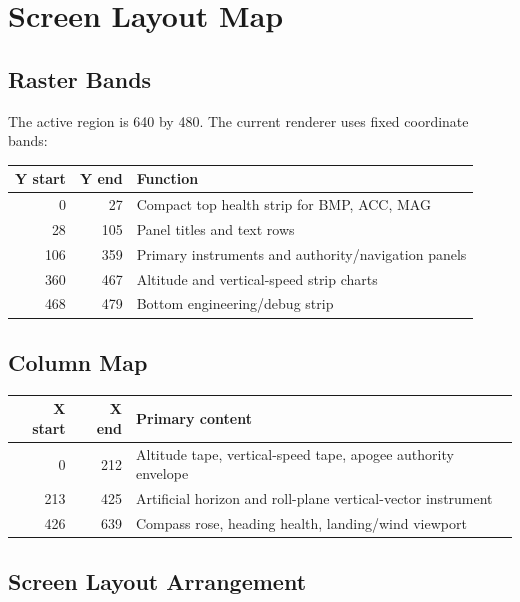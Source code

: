 \documentclass{article}
\begin{document}
\section{Screen Layout Map}

\subsection{Raster Bands}

The active region is 640 by 480.  The current renderer uses fixed coordinate
bands:

\begin{center}
\begin{tabular}{r r l}
\toprule
\textbf{Y start} & \textbf{Y end} & \textbf{Function} \\
\midrule
0   & 27  & Compact top health strip for BMP, ACC, MAG \\
28  & 105 & Panel titles and text rows \\
106 & 359 & Primary instruments and authority/navigation panels \\
360 & 467 & Altitude and vertical-speed strip charts \\
468 & 479 & Bottom engineering/debug strip \\
\bottomrule
\end{tabular}
\end{center}

\subsection{Column Map}

\begin{center}
\begin{tabular}{r r l}
\toprule
\textbf{X start} & \textbf{X end} & \textbf{Primary content} \\
\midrule
0   & 212 & Altitude tape, vertical-speed tape, apogee authority envelope \\
213 & 425 & Artificial horizon and roll-plane vertical-vector instrument \\
426 & 639 & Compass rose, heading health, landing/wind viewport \\
\bottomrule
\end{tabular}
\end{center}

\subsection{Screen Layout Arrangement}
\end{document}
